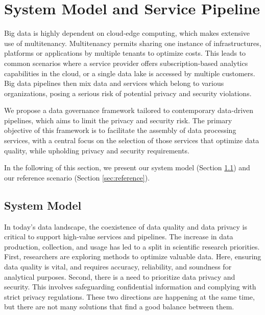 \section{System Model and Service Pipeline}\label{sec:requirements}
Big data is highly dependent on cloud-edge computing, which makes extensive use of multitenancy.
Multitenancy permits sharing one instance of infrastructures, platforms or applications by multiple tenants to optimize costs. This leads to common scenarios where a service provider offers subscription-based analytics capabilities in the cloud, or a single data lake is accessed by multiple customers. Big data pipelines then mix data and services which belong to various organizations, posing a serious risk of potential privacy and security violations.

We propose a data governance framework tailored to contemporary data-driven pipelines, which aims to limit the privacy and security risk. The primary objective of this framework is to facilitate the assembly of data processing services, with a central focus on the selection of those services that optimize data quality, while upholding privacy and security requirements.

In the following of this section, we present our system model (Section \ref{sec:systemmodel}) and our reference scenario (Section \ref{sec:reference}).

\subsection{System Model}\label{sec:systemmodel}
In today's data landscape, the coexistence of data quality and data privacy is critical to support high-value services and pipelines. The increase in data production, collection, and usage has led to a split in scientific research priorities.
First, researchers are exploring methods to optimize valuable data. Here, ensuring data quality is vital, and requires accuracy, reliability, and soundness for analytical purposes.
Second, there is a need to prioritize data privacy and security. This involves safeguarding confidential information and complying with strict privacy regulations. These two directions are happening at the same time, but there are not many solutions that find a good balance between them.

